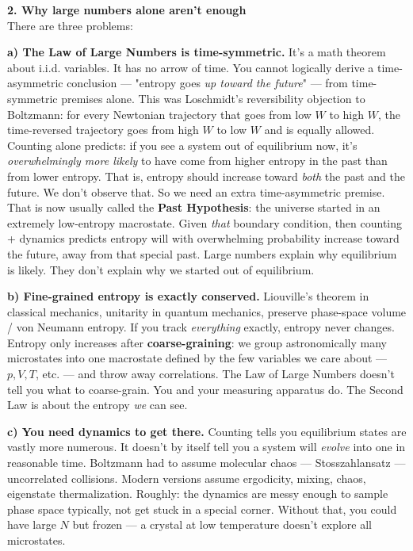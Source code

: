 \documentclass[11pt, a4paper]{article}
\begin{document}
{{        \vspace{0.2cm}
        \textbf{2. Why large numbers alone aren't enough}\\
        There are three problems:
        
        \textbf{a) The Law of Large Numbers is time-symmetric.} It's a math theorem about i.i.d. variables. It has no arrow of time. You cannot logically derive a time-asymmetric conclusion --- "entropy goes \textit{up toward the future}" --- from time-symmetric premises alone. This was Loschmidt's reversibility objection to Boltzmann: for every Newtonian trajectory that goes from low $W$ to high $W$, the time-reversed trajectory goes from high $W$ to low $W$ and is equally allowed. Counting alone predicts: if you see a system out of equilibrium now, it's \textit{overwhelmingly more likely} to have come from higher entropy in the past than from lower entropy. That is, entropy should increase toward \textit{both} the past and the future. We don't observe that. So we need an extra time-asymmetric premise. That is now usually called the \textbf{Past Hypothesis}: the universe started in an extremely low-entropy macrostate. Given \textit{that} boundary condition, then counting + dynamics predicts entropy will with overwhelming probability increase toward the future, away from that special past. Large numbers explain why equilibrium is likely. They don't explain why we started out of equilibrium.
        
        \textbf{b) Fine-grained entropy is exactly conserved.} Liouville's theorem in classical mechanics, unitarity in quantum mechanics, preserve phase-space volume / von Neumann entropy. If you track \textit{everything} exactly, entropy never changes. Entropy only increases after \textbf{coarse-graining}: we group astronomically many microstates into one macrostate defined by the few variables we care about --- $p, V, T$, etc. --- and throw away correlations. The Law of Large Numbers doesn't tell you what to coarse-grain. You and your measuring apparatus do. The Second Law is about the entropy \textit{we} can see.
        
        \textbf{c) You need dynamics to get there.} Counting tells you equilibrium states are vastly more numerous. It doesn't by itself tell you a system will \textit{evolve} into one in reasonable time. Boltzmann had to assume molecular chaos --- Stosszahlansatz --- uncorrelated collisions. Modern versions assume ergodicity, mixing, chaos, eigenstate thermalization. Roughly: the dynamics are messy enough to sample phase space typically, not get stuck in a special corner. Without that, you could have large $N$ but frozen --- a crystal at low temperature doesn't explore all microstates.
        
}}
\end{document}
